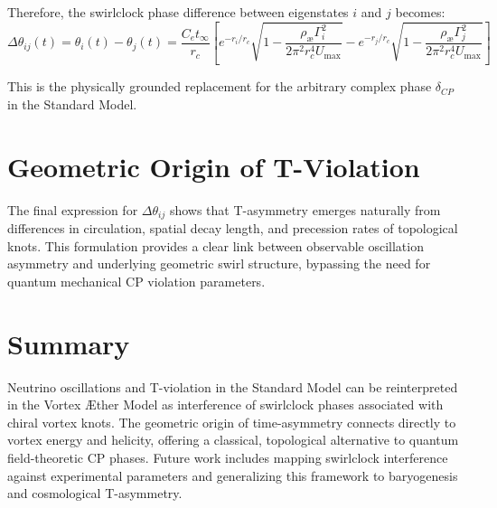 Therefore, the swirlclock phase difference between eigenstates \( i \) and \( j \) becomes:
\begin{equation}
\Delta \theta_{ij}(t) = \theta_i(t) - \theta_j(t) = \frac{C_e t_\infty}{r_c} \left[
e^{-r_i/r_c} \sqrt{1 - \frac{\rho_\text{\ae} \Gamma_i^2}{2 \pi^2 r_c^4 U_\text{max}}} -
e^{-r_j/r_c} \sqrt{1 - \frac{\rho_\text{\ae} \Gamma_j^2}{2 \pi^2 r_c^4 U_\text{max}}}
\right]
\end{equation}

This is the physically grounded replacement for the arbitrary complex phase \( \delta_{CP} \) in the Standard Model.

\section{Geometric Origin of T-Violation}

The final expression for \( \Delta \theta_{ij} \) shows that T-asymmetry emerges naturally from differences in circulation, spatial decay length, and precession rates of topological knots. This formulation provides a clear link between observable oscillation asymmetry and underlying geometric swirl structure, bypassing the need for quantum mechanical CP violation parameters.

\section{Summary}

Neutrino oscillations and T-violation in the Standard Model can be reinterpreted in the Vortex \AE ther Model as interference of swirlclock phases associated with chiral vortex knots. The geometric origin of time-asymmetry connects directly to vortex energy and helicity, offering a classical, topological alternative to quantum field-theoretic CP phases. Future work includes mapping swirlclock interference against experimental parameters and generalizing this framework to baryogenesis and cosmological T-asymmetry.

